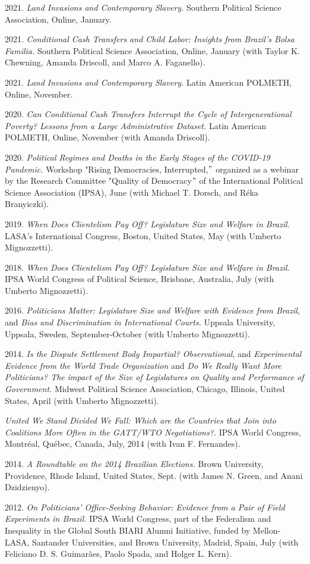 \documentclass[a4paper,11.5pt]{article}
\renewenvironment{itemize}{
	\begin{list}{}{
			\setlength{\leftmargin}{1.5em}
		}
		}{
	\end{list}
}
\begin{document}
\begin{itemize}
	\item 2021. \emph{Land Invasions and Contemporary Slavery.}
	Southern Political Science Association,  Online, January.
	\item 2021. \emph{Conditional Cash Transfers and Child Labor: Insights from Brazil's Bolsa Familia.} Southern Political Science Association,  Online, January (with Taylor K. Chewning, Amanda Driscoll, and Marco A. Faganello).
	\item 2021. \emph{Land Invasions and Contemporary Slavery.} Latin American POLMETH, Online, November.
	\item 2020. \emph{Can Conditional Cash Transfers Interrupt the Cycle of Intergenerational Poverty? Lessons from a Large Administrative Dataset.} Latin American POLMETH, Online, November (with Amanda Driscoll).
	\item 2020. \emph{Political Regimes and Deaths in the Early Stages of the COVID-19 Pandemic.} Workshop "Rising Democracies, Interrupted,$"$  organized as a webinar by the Research Committee "Quality of Democracy$"$ of the International Political Science Association (IPSA), June (with Michael T. Dorsch, and Réka Branyiczki).
	\item 2019. \emph{When Does Clientelism Pay Off? Legislature Size and Welfare in Brazil.} LASA's International Congress, Boston, United States, May (with Umberto Mignozzetti). 
	\item 2018. \emph{When Does Clientelism Pay Off? Legislature Size and Welfare in Brazil.} IPSA World Congress of Political Science, Brisbane, Australia, July (with Umberto Mignozzetti).
	\item  2016. \emph{Politicians Matter: Legislature Size and Welfare with Evidence from Brazil}, and \emph{Bias and Discrimination in International Courts.} Uppsala University, Uppsala, Sweden, September-October (with Umberto Mignozzetti).
	\item 2014. \emph{Is the Dispute Settlement Body Impartial? Observational}, and \emph{Experimental Evidence from the World Trade Organization} and \emph{Do We Really Want More Politicians? The impact of the Size of Legislatures on Quality and Performance of Government.} Midwest Political Science Association, Chicago, Illinois, United States, April (with Umberto Mignozzetti).
	\item \emph{United We Stand Divided We Fall: Which are the Countries that Join into Coalitions More Often in the GATT/WTO Negotiations?.} IPSA World Congress, Montréal, Québec, Canada, July, 2014 (with Ivan F. Fernandes).
	\item 2014. \emph{A Roundtable on the 2014 Brazilian Elections.} Brown University, Providence, Rhode Island, United States, Sept. (with James N. Green, and Anani Dzidzienyo).
	\item 2012. \emph{On Politicians' Office-Seeking Behavior: Evidence from a Pair of Field Experiments in Brazil.} IPSA World Congress, part of the Federalism and Inequality in the Global South BIARI Alumni Initiative, funded by Mellon-LASA, Santander Universities, and Brown University, Madrid, Spain, July (with Feliciano D. S. Guimarães, Paolo Spada, and Holger L. Kern).
\end{itemize}
\end{document}
